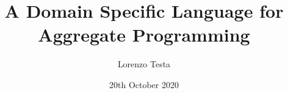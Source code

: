 \documentclass[10pt]{beamer} %
\begin{document}
\title{A Domain Specific Language for Aggregate Programming}
\date{20th October 2020}
\author{Lorenzo Testa}

\newcommand*\sequence[1]{$\overline{#1}$}
\end{document}

